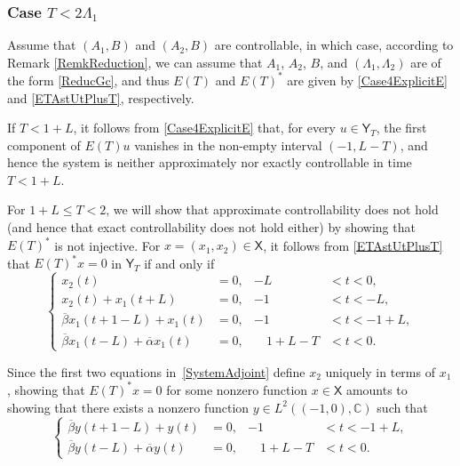 \documentclass[JEP,XML,SOM,Unicode]{cedram}
\theoremstyle{plain}
\theoremstyle{definition}
\begin{document}
\subsubsection{\texorpdfstring{Case $T < 2 \Lambda_1$}{Case T < 2 Lambda1}}

Assume that $(A_1, B)$ and $(A_2, B)$ are controllable, in which case, according to Remark \ref{RemkReduction}, we can assume that $A_1$, $A_2$, $B$, and $(\Lambda_1, \Lambda_2)$ are of the form \eqref{ReducGc}, and thus $E(T)$ and $E(T)^\ast$ are given by \eqref{Case4ExplicitE} and \eqref{ETAstUtPlusT}, respectively.

If $T < 1 + L$, it follows from \eqref{Case4ExplicitE} that, for every $u \in \mathsf Y_T$, the first component of $E(T) u$ vanishes in the non-empty interval $(-1, L - T)$, and hence the system is neither approximately nor exactly controllable in time $T < 1 + L$.

For $1 + L \leq T < 2$, we will show that approximate controllability does not hold (and hence that exact controllability does not hold either) by showing that $E(T)^\ast$ is not injective. For $x = (x_1, x_2) \in \mathsf X$, it follows from \eqref{ETAstUtPlusT} that $E(T)^\ast x = 0$ in $\mathsf Y_T$ if and only if
\begin{equation}
\label{SystemAdjoint}
\left\{
\begin{aligned}
x_2(t) & = 0, & -L & < t < 0, \\
x_2(t) + x_1(t + L) & = 0, & -1 & < t < -L, \\
\overline\beta x_1(t + 1 - L) + x_1(t) & = 0, & -1 & < t < -1 + L, \\
\overline\beta x_1(t - L) + \overline\alpha x_1(t) & = 0, & \quad 1 + L - T & < t < 0.
\end{aligned}
\right.
\end{equation}

Since the first two equations in~\eqref{SystemAdjoint} define $x_2$ uniquely in terms of $x_1$, showing that $E(T)^\ast x = 0$ for some nonzero function $x \in \mathsf X$ amounts to showing that there exists a nonzero function $y \in L^2((-1, 0), \mathbb C)$ such that
\begin{equation}
\label{EquationV}
\left\{
\begin{aligned}
\overline\beta y(t + 1 - L) + y(t) & = 0, & -1 & < t < -1 + L, \\
\overline\beta y(t - L) + \overline\alpha y(t) & = 0, & \quad 1 + L - T & < t < 0.
\end{aligned}
\right.
\end{equation}
\end{document}
